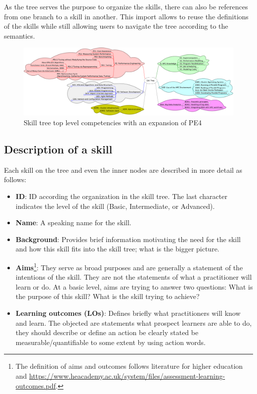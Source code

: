 \documentclass[jocse]{jocseart}
\begin{document}
As the tree serves the purpose to organize the skills, there can also be references from one branch to a skill in another.
This import allows to reuse the definitions of the skills while still allowing users to navigate the tree according to the semantics.

\begin{figure}[tb!]
	\centering
	\includegraphics[width=15.0cm]{skill-tree}
	\caption{Skill tree top level competencies with an expansion of PE4}
	\label{fig:skill-tree}
\end{figure}

\subsection{Description of a skill}

Each skill on the tree and even the inner nodes are described in more detail as follows:

\begin{itemize}
  \item \textbf{ID}: ID according the organization in the skill tree. The last character indicates the level of the skill (Basic, Intermediate, or Advanced).
  \item \textbf{Name}: A speaking name for the skill.
  \item \textbf{Background}: Provides brief information motivating the need for the skill and how this skill fits into the skill tree; what is the bigger picture.
  \item \textbf{Aims}\footnote{The definition of aims and outcomes follows literature for higher education \cite{williamson2011good} and \url{https://www.heacademy.ac.uk/system/files/assessment-learning-outcomes.pdf}.}: They serve as broad purposes and are generally a statement of the intentions of the skill.
  They are not the statements of what a practitioner will learn or do.
  At a basic level, aims are trying to answer two questions: What is the purpose of this skill?
  What is the skill trying to achieve?
  \item \textbf{Learning outcomes (LOs)}: Defines briefly what practitioners will know and learn.
  The objected are statements what prospect learners are able to do, they should
  describe or define an action be clearly stated be measurable/quantifiable to some extent by using action words.
\end{itemize}
\end{document}
